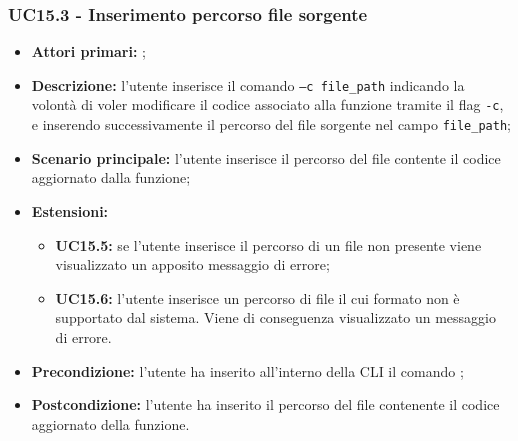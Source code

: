 \subsubsection{UC15.3 - Inserimento percorso file sorgente}
\begin{itemize}
	\item \textbf{Attori primari:} \us{};
	\item \textbf{Descrizione:} l'utente inserisce il comando \pedit{} \texttt{–c file\_path} indicando la volontà di voler modificare il codice associato alla funzione tramite il flag \texttt{-c}, e inserendo successivamente il percorso del file sorgente nel campo \texttt{file\_path}; 
	\item \textbf{Scenario principale:} l'utente inserisce il percorso del file contente il codice aggiornato dalla funzione; 
	\item \textbf{Estensioni:} 
	\begin{itemize}
		\item \textbf{UC15.5:} se l'utente inserisce il percorso di un file non presente viene visualizzato un apposito messaggio di errore;
		\item \textbf{UC15.6:} l’utente inserisce un percorso di file il cui formato non è supportato dal sistema. Viene di conseguenza visualizzato un messaggio di errore.
	\end{itemize}
	\item \textbf{Precondizione:} l’utente ha inserito all’interno della CLI il comando \edit{}; 
	\item \textbf{Postcondizione:} l’utente ha inserito il percorso del file contenente il codice aggiornato della funzione.
\end{itemize}